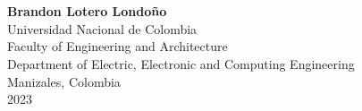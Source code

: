 
\begin{center}

  \begin{figure} \centering
    \\[1.8cm]
  \end{figure}

  \thispagestyle{empty}

  \begin{spacing}{1.9}
    \textbf{\huge \thesistitle    }\\[2cm]
  \end{spacing}

  \Large
  \textbf{Brandon Lotero Londoño}\\[3cm]

  \small
  Universidad Nacional de Colombia\\
  Faculty of Engineering and Architecture\\
  Department of Electric, Electronic and Computing Engineering\\
  Manizales, Colombia\\
  2023\\

\end{center}

\newpage{\pagestyle{empty}\cleardoublepage}
\newpage

